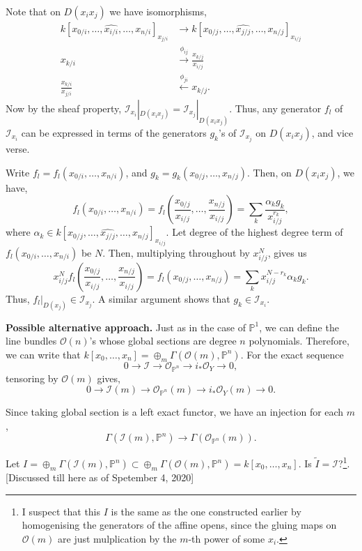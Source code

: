 \documentclass[11pt]{amsart}
\renewcommand{\tilde}{\widetilde}
\newcommand{\sI}{{\mathcal I}}
\newcommand{\sO}{{\mathcal O}}
\renewcommand{\P}{{\mathbb P}}
\theoremstyle{definition}
\begin{document}
Note that on $D(x_i x_j)$ we have isomorphisms,
\begin{align*}
k[x_{0/i},\ldots,\widehat{x_{i/i}},\ldots,x_{n/i}]_{x_{j/i}} &\rightarrow k[x_{0/j},\ldots,\widehat{x_{j/j}},\ldots,x_{n/j}]_{x_{i/j}}\\
x_{k/i} &\overset{\phi_{ij}}{\longrightarrow} \frac{x_{k/j}}{x_{i/j}}\\
\frac{x_{k/i}}{x_{j/i}} &\overset{\phi_{ji}}{\longleftarrow} x_{k/j}.
\end{align*}
Now by the sheaf property, $\sI_{x_i}|_{D(x_i x_j)}=\sI_{x_j}|_{D(x_i x_j)}$. Thus, any generator $f_l$ of $\sI_{x_i}$ can be expressed in terms of the generators $g_k$'s of $\sI_{x_j}$ on $D(x_i x_j)$, and vice verse.

Write $f_l=f_l(x_{0/i},\ldots,x_{n/i})$, and $g_k=g_k(x_{0/j},\ldots,x_{n/j})$. Then, on $D(x_i x_j)$, we have,
\[ f_l(x_{0/i},\ldots,x_{n/i})= f_l(\frac{x_{0/j}}{x_{i/j}}, \ldots,\frac{x_{n/j}}{x_{i/j}})=\sum_k \frac{\alpha_k g_k}{x_{i/j}^{r_k}}, \]
where $\alpha_k\in k[x_{0/j},\ldots,\widehat{x_{j/j}},\ldots,x_{n/j}]_{x_{i/j}}$. Let degree of the highest degree term of $f_l(x_{0/i},\ldots,x_{n/i})$ be $N$. Then, multiplying throughout by $x_{i/j}^N$, gives us
\[x_{i/j}^N f_l(\frac{x_{0/j}}{x_{i/j}},\ldots,\frac{x_{n/j}}{x_{i/j}})= f_l(x_{0/j},\ldots,x_{n/j})=\sum_k  x_{i/j}^{N-r_k} \alpha_k g_k.\]
Thus, $f_l|_{D(x_j)}\in \sI_{x_j}$. A similar argument shows that $g_k\in \sI_{x_i}$.

\noindent\textbf{Possible alternative approach.} Just as in the case of $\P^1$, we can define the line bundles $\sO(n)$'s whose global sections are degree $n$ polynomials. Therefore, we can write that $k[x_0,\ldots,x_n]=\oplus_m\Gamma (\sO(m),\P^n)$. For the exact sequence
\[0\rightarrow \sI\rightarrow \sO_{\P^n}\rightarrow i_*\sO_Y\rightarrow 0,\]
tensoring by $\sO(m)$ gives,
\[0\rightarrow \sI(m)\rightarrow \sO_{\P^n}(m)\rightarrow i_*\sO_Y(m)\rightarrow 0.\]

Since taking global section is a left exact functor, we have an injection for each $m$,
\[\Gamma (\sI(m),\P^n)\rightarrow \Gamma (\sO_{\P^n}(m)).\]

Let $I=\oplus_m \Gamma (\sI(m),\P^n)\subset \oplus_m\Gamma (\sO(m),\P^n) = k[x_0,\ldots,x_n]$. Is $\tilde{I}=\sI$?\footnote{I suspect that this $I$ is the same as the one constructed earlier by homogenising the generators of the affine opens, since the gluing maps on $\sO(m)$ are just mulplication by the $m$-th power of some $x_i$.}. [Discussed till here as of Spetember 4, 2020]
\end{document}
